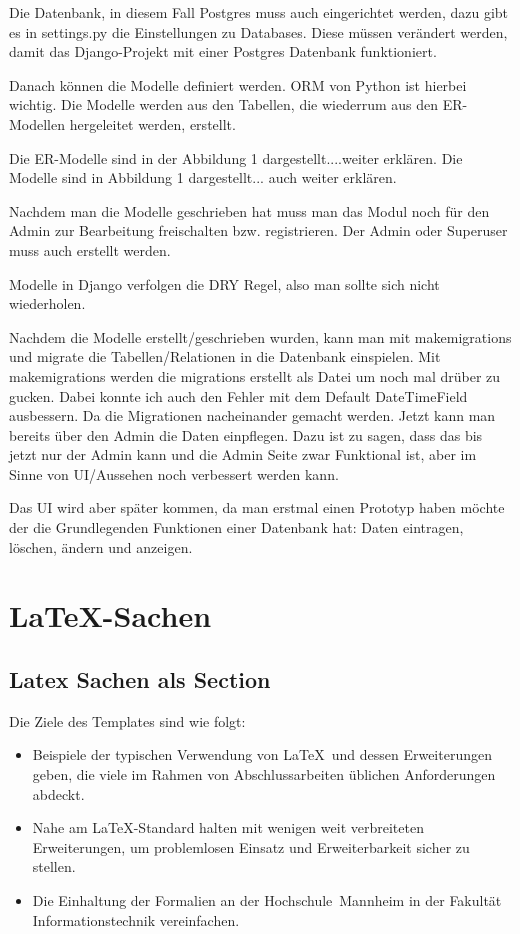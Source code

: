 \documentclass[11pt,a4paper]{report}
\begin{document}
Die Datenbank, in diesem Fall Postgres muss auch eingerichtet werden, dazu gibt es in settings.py die Einstellungen zu Databases. Diese müssen verändert werden, damit das Django-Projekt mit einer Postgres Datenbank funktioniert. 

Danach können die Modelle definiert werden. ORM von Python ist hierbei wichtig. Die Modelle werden aus den Tabellen, die wiederrum aus den ER-Modellen hergeleitet werden, erstellt.

Die ER-Modelle sind in der Abbildung 1 dargestellt....weiter erklären. Die Modelle sind in Abbildung 1 dargestellt... auch weiter erklären.

Nachdem man die Modelle geschrieben hat muss man das Modul noch für den Admin zur Bearbeitung freischalten bzw. registrieren. Der Admin oder Superuser muss auch erstellt werden.

Modelle in Django verfolgen die DRY Regel, also man sollte sich nicht wiederholen.

Nachdem die Modelle erstellt/geschrieben wurden, kann man mit makemigrations und migrate die Tabellen/Relationen in die Datenbank einspielen. Mit makemigrations werden die migrations erstellt als Datei um noch mal drüber zu gucken. Dabei konnte ich auch den Fehler mit dem Default DateTimeField ausbessern. Da die Migrationen nacheinander gemacht werden. Jetzt kann man bereits über den Admin die Daten einpflegen. Dazu ist zu sagen, dass das bis jetzt nur der Admin kann und die Admin Seite zwar Funktional ist, aber im Sinne von UI/Aussehen noch verbessert werden kann.




Das UI wird aber später kommen, da man erstmal einen Prototyp haben möchte der die Grundlegenden Funktionen einer  Datenbank hat: Daten eintragen, löschen, ändern und anzeigen.






\chapter{\LaTeX-Sachen} \label{chap:latex}
\section{Latex Sachen als Section}

Die Ziele des Templates sind wie folgt:
\begin{itemize}
\item Beispiele der typischen Verwendung von \LaTeX\ und dessen Erweiterungen 
  geben, die viele im Rahmen von Abschlussarbeiten üblichen Anforderungen 
  abdeckt.
\item Nahe am \LaTeX-Standard halten mit wenigen weit verbreiteten 
  Erweiterungen, um problemlosen Einsatz und Erweiterbarkeit sicher zu stellen.
\item Die Einhaltung der Formalien an der Hochschule~Mannheim in der
  Fakultät Informationstechnik vereinfachen.
\end{itemize}
\end{document}
